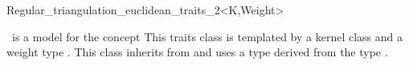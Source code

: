 

\begin{ccRefClass}{Regular_triangulation_euclidean_traits_2<K,Weight>}  %

\ccDefinition
  

 \ccRefName\  is a  model for the concept 
This traits class is templated by a kernel class 
and a weight type .
This class inherits from 
and uses a  type
derived from the type .


\ccIsModel
{}

\ccInheritsFrom
{}


\ccSeeAlso
{} \\


\end{ccRefClass}


